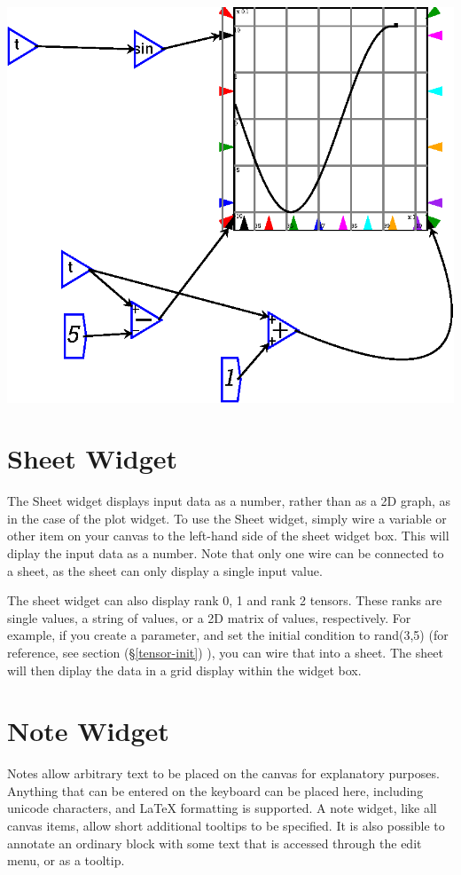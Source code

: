 \begin{description}
\begin{center}
\includegraphics{images/plotSlidingWindow.eps}
\end{center}
\end{description}

\section{Sheet Widget}
 \label{Sheet} The Sheet widget displays input data as a
 number, rather than as a 2D graph, as in the case of the plot widget.
 To use the Sheet widget, simply wire a variable or other item on your
 canvas to the left-hand side of the sheet widget box. This will diplay
 the input data as a number. Note that only one wire can be connected to
 a sheet, as the sheet can only display a single input value.
 
 The sheet widget can also display rank 0, 1 and rank 2 tensors. These ranks are
 single values, a string of values, or a 2D matrix of values, respectively.
 For example, if you create a parameter, and set the initial condition to rand(3,5)
 (for reference, see section (\S\ref{tensor-init}) ), you can wire that into a sheet.
 The sheet will then diplay the data in a grid display within the widget box.

\section{Note Widget}
 \label{Notes}\label{Item} Notes allow arbitrary text to be
placed on the canvas for explanatory purposes. Anything that can be
entered on the keyboard can be placed here, including unicode
characters, and LaTeX formatting is supported. A note
widget, like all canvas items, allow short additional tooltips to be
specified. It is also possible to annotate an ordinary block with some text
that is accessed through the edit menu, or as a tooltip.

